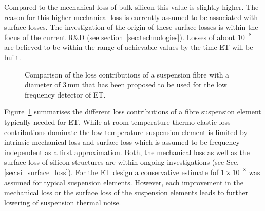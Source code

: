 Compared to the mechanical loss of bulk silicon this value is slightly higher. The reason for this higher mechanical loss is currently assumed to be associated with surface losses. The investigation of the origin of these surface losses is within the focus of the current R\&D (see section~\ref{sec:technologies}). Losses of about $10^{-8}$ are believed to be within the range of achievable values by the time ET will be built.

\begin{figure}[!h]
\begin{center}
\end{center}
\caption{Comparison of the loss contributions of a suspension fibre with a diameter of 3\,mm that has been proposed to be used for the low frequency detector of ET.}
\label{fig:susp_loss}
\end{figure}

Figure~\ref{fig:susp_loss} summarises the different loss contributions of a fibre suspension element typically needed for ET. While at room temperature thermo-elastic loss contributions dominate the low temperature suspension element is limited by intrinsic mechanical loss and surface loss which is assumed to be frequency independent as a first approximation. Both, the mechanical loss as well as the surface loss of silicon structures are within ongoing investigations (see Sec.\,\ref{sec:si_surface_loss}). For the ET design a conservative estimate fof $1\times10^{-8}$ was assumed for typical suspension elements. However, each improvement in the mechanical loss or the surface loss of the suspension elements leads to further lowering of suspension thermal noise.

